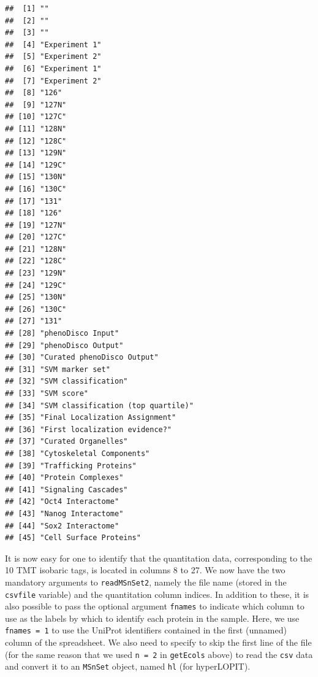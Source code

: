 \begin{verbatim}
##  [1] ""                                 
##  [2] ""                                 
##  [3] ""                                 
##  [4] "Experiment 1"                     
##  [5] "Experiment 2"                     
##  [6] "Experiment 1"                     
##  [7] "Experiment 2"                     
##  [8] "126"                              
##  [9] "127N"                             
## [10] "127C"                             
## [11] "128N"                             
## [12] "128C"                             
## [13] "129N"                             
## [14] "129C"                             
## [15] "130N"                             
## [16] "130C"                             
## [17] "131"                              
## [18] "126"                              
## [19] "127N"                             
## [20] "127C"                             
## [21] "128N"                             
## [22] "128C"                             
## [23] "129N"                             
## [24] "129C"                             
## [25] "130N"                             
## [26] "130C"                             
## [27] "131"                              
## [28] "phenoDisco Input"                 
## [29] "phenoDisco Output"                
## [30] "Curated phenoDisco Output"        
## [31] "SVM marker set"                   
## [32] "SVM classification"               
## [33] "SVM score"                        
## [34] "SVM classification (top quartile)"
## [35] "Final Localization Assignment"    
## [36] "First localization evidence?"     
## [37] "Curated Organelles"               
## [38] "Cytoskeletal Components"          
## [39] "Trafficking Proteins"             
## [40] "Protein Complexes"                
## [41] "Signaling Cascades"               
## [42] "Oct4 Interactome"                 
## [43] "Nanog Interactome"                
## [44] "Sox2 Interactome"                 
## [45] "Cell Surface Proteins"
\end{verbatim}

It is now easy for one to identify that the quantitation data,
corresponding to the 10 TMT isobaric tags, is located in columns 8 to
27. We now have the two mandatory arguments to \texttt{readMSnSet2},
namely the file name (stored in the \texttt{csvfile} variable) and the
quantitation column indices. In addition to these, it is also possible
to pass the optional argument \texttt{fnames} to indicate which column
to use as the labels by which to identify each protein in the sample.
Here, we use \texttt{fnames = 1} to use the UniProt identifiers
contained in the first (unnamed) column of the spreadsheet. We also need
to specify to skip the first line of the file (for the same reason that
we used \texttt{n = 2} in \texttt{getEcols} above) to read the
\texttt{csv} data and convert it to an \texttt{MSnSet} object, named
\texttt{hl} (for hyperLOPIT).

